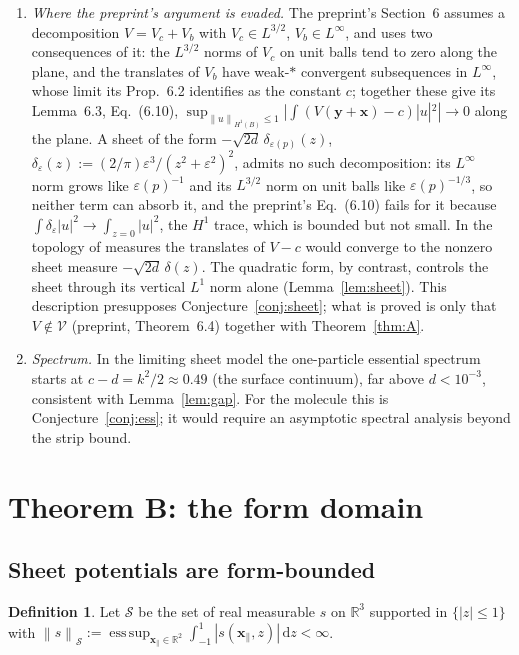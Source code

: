 \documentclass[11pt,a4paper]{article}
\theoremstyle{plain}
\theoremstyle{definition}
\newtheorem{definition}[theorem]{Definition}
\theoremstyle{remark}
\newcommand{\R}{\mathbb{R}}
\newcommand{\VV}{\mathcal{V}}
\renewcommand{\SS}{\mathcal{S}}
\newcommand{\dd}{\,\mathrm{d}}
\newcommand{\norm}[1]{\left\|#1\right\|}
\begin{document}
\begin{enumerate}
\item \emph{Where the preprint's argument is evaded.} The preprint's Section~6 assumes a decomposition $V=V_c+V_b$ with $V_c\in L^{3/2}$, $V_b\in L^\infty$, and uses two consequences of it: the $L^{3/2}$ norms of $V_c$ on unit balls tend to zero along the plane, and the translates of $V_b$ have weak-$*$ convergent subsequences in $L^\infty$, whose limit its Prop.~6.2 identifies as the constant $c$; together these give its Lemma~6.3, Eq.~(6.10), $\sup_{\norm u_{H^1(B)}\le1}|\int(V(\mathbf y+\mathbf x)-c)|u|^2|\to0$ along the plane. A sheet of the form $-\sqrt{2d}\,\delta_{\varepsilon(p)}(z)$, $\delta_\varepsilon(z):=(2/\pi)\varepsilon^3/(z^2+\varepsilon^2)^2$, admits no such decomposition: its $L^\infty$ norm grows like $\varepsilon(p)^{-1}$ and its $L^{3/2}$ norm on unit balls like $\varepsilon(p)^{-1/3}$, so neither term can absorb it, and the preprint's Eq.~(6.10) fails for it because $\int\delta_\varepsilon|u|^2\to\int_{z=0}|u|^2$, the $H^1$ trace, which is bounded but not small. In the topology of measures the translates of $V-c$ would converge to the nonzero sheet measure $-\sqrt{2d}\,\delta(z)$. The quadratic form, by contrast, controls the sheet through its vertical $L^1$ norm alone (Lemma~\ref{lem:sheet}). This description presupposes Conjecture~\ref{conj:sheet}; what is proved is only that $V\notin\VV$ (preprint, Theorem~6.4) together with Theorem~\ref{thm:A}.
\item \emph{Spectrum.} In the limiting sheet model the one-particle essential spectrum starts at $c-d=k^2/2\approx0.49$ (the surface continuum), far above $d<10^{-3}$, consistent with Lemma~\ref{lem:gap}. For the molecule this is Conjecture~\ref{conj:ess}; it would require an asymptotic spectral analysis beyond the strip bound.
\end{enumerate}

\section{Theorem B: the form domain}\label{sec:B}

\subsection{Sheet potentials are form-bounded}
\begin{definition}
Let $\SS$ be the set of real measurable $s$ on $\R^3$ supported in $\{|z|\le1\}$ with $\norm s_\SS:=\operatorname*{ess\,sup}_{\mathbf x_\parallel\in\R^2}\int_{-1}^{1}|s(\mathbf x_\parallel,z)|\dd z<\infty$.
\end{definition}
\end{document}
